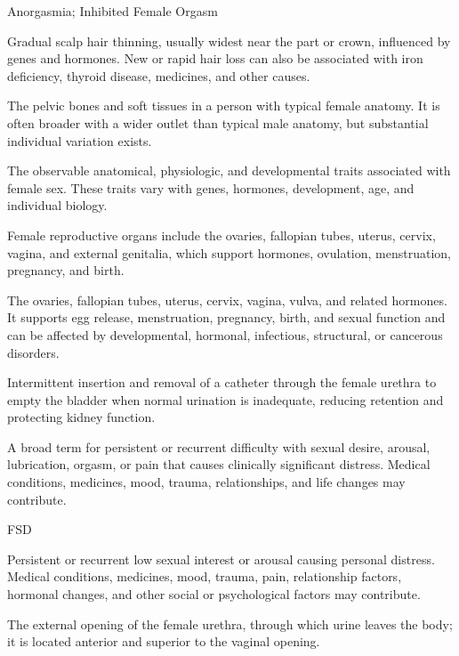 \synonyms
Anorgasmia; Inhibited Female Orgasm

 Gradual scalp hair thinning, usually widest near the part or crown, influenced by genes and hormones. New or rapid hair loss can also be associated with iron deficiency, thyroid disease, medicines, and other causes.

 The pelvic bones and soft tissues in a person with typical female anatomy. It is often broader with a wider outlet than typical male anatomy, but substantial individual variation exists.

 The observable anatomical, physiologic, and developmental traits associated with female sex. These traits vary with genes, hormones, development, age, and individual biology.

 Female reproductive organs include the ovaries, fallopian tubes, uterus, cervix, vagina, and external genitalia, which support hormones, ovulation, menstruation, pregnancy, and birth.

 The ovaries, fallopian tubes, uterus, cervix, vagina, vulva, and related hormones. It supports egg release, menstruation, pregnancy, birth, and sexual function and can be affected by developmental, hormonal, infectious, structural, or cancerous disorders.

 Intermittent insertion and removal of a catheter through the female urethra to empty the bladder when normal urination is inadequate, reducing retention and protecting kidney function.

 A broad term for persistent or recurrent difficulty with sexual desire, arousal, lubrication, orgasm, or pain that causes clinically significant distress. Medical conditions, medicines, mood, trauma, relationships, and life changes may contribute.

\synonyms
FSD

 Persistent or recurrent low sexual interest or arousal causing personal distress. Medical conditions, medicines, mood, trauma, pain, relationship factors, hormonal changes, and other social or psychological factors may contribute.

 The external opening of the female urethra, through which urine leaves the body; it is located anterior and superior to the vaginal opening.

